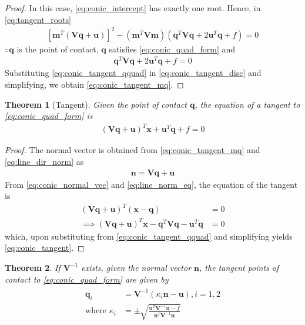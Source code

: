 \documentclass[]{interact}
\theoremstyle{plain}%
\newtheorem{theorem}{Theorem}[section]
\theoremstyle{definition}
\theoremstyle{remark}
\providecommand{\sbrak}[1]{\ensuremath{{}\left[#1\right]}}
\providecommand{\brak}[1]{\ensuremath{\left(#1\right)}}
\let\vec\mathbf
\begin{document}
\begin{proof}
  In this case, \eqref{eq:conic_intercept} has exactly one root.  Hence, 
  in \eqref{eq:tangent_roots}
  \begin{align}
  \sbrak{
  \vec{m}^T\brak{\vec{V}\vec{q}+\vec{u}}
  }^2 -\brak{\vec{m}^T\vec{V}\vec{m}}
  \brak
  {
  \vec{q}^T\vec{V}\vec{q} + 2\vec{u}^T\vec{q} +f
  } = 0                                                                                             
  \label{eq:conic_tangent_disc}
  \end{align}                    
  $\because \vec{q}$ is the point of contact, $\vec{q}$ satisfies \eqref{eq:conic_quad_form}
  and 
  \begin{align}
  \vec{q}^T\vec{V}\vec{q} + 2\vec{u}^T\vec{q} +f = 0
  \label{eq:conic_tangent_qquad}
  \end{align}
  Substituting \eqref{eq:conic_tangent_qquad} in \eqref{eq:conic_tangent_disc} and simplifying, we obtain \eqref{eq:conic_tangent_mq}.
\end{proof}
\begin{theorem}[Tangent]
  Given the point of contact $\vec{q}$, the equation of a tangent to \eqref{eq:conic_quad_form} is 
  \begin{align}
  \brak{\vec{V}\vec{q}+\vec{u}}^T\vec{x}+\vec{u}^T\vec{q}+f = 0
  \label{eq:conic_tangent_final}
  \end{align}
\end{theorem}
\begin{proof}
  The normal vector is obtained from \eqref{eq:conic_tangent_mq} and \eqref{eq:line_dir_norm}
  as
  \begin{align}
  \label{eq:conic_normal_vec}
  \vec{n} = \vec{V}\vec{q}+\vec{u}
  \end{align}  
  From \eqref{eq:conic_normal_vec} and \eqref{eq:line_norm_eq}, the equation of the tangent is\begin{align}
    \brak{\vec{V}\vec{q}+\vec{u}}^T\brak{\vec{x}-\vec{q}} &=0
    \\
    \implies \brak{\vec{V}\vec{q}+\vec{u}}^T\vec{x}-\vec{q}^T\vec{V}\vec{q}-\vec{u}^T\vec{q} &= 0
    \end{align}
    which, upon substituting from \eqref{eq:conic_tangent_qquad} and simplifying yields \eqref{eq:conic_tangent}.
\end{proof}
\begin{theorem}
  If $\vec{V}^{-1}$ exists, given the normal vector $\vec{n}$, the tangent points of contact to \eqref{eq:conic_quad_form} are given by
\begin{align}
  \begin{split}
\vec{q}_i &= \vec{V}^{-1}\brak{\kappa_i \vec{n}-\vec{u}}, i = 1,2
\\
\text{where }\kappa_i &= \pm \sqrt{
\frac{
\vec{u}^T\vec{V}^{-1}\vec{u}-f
}
{
\vec{n}^T\vec{V}^{-1}\vec{n}
}
}
  \end{split}
\label{eq:conic_tangent_qk}
\end{align}
\end{theorem}
\end{document}
